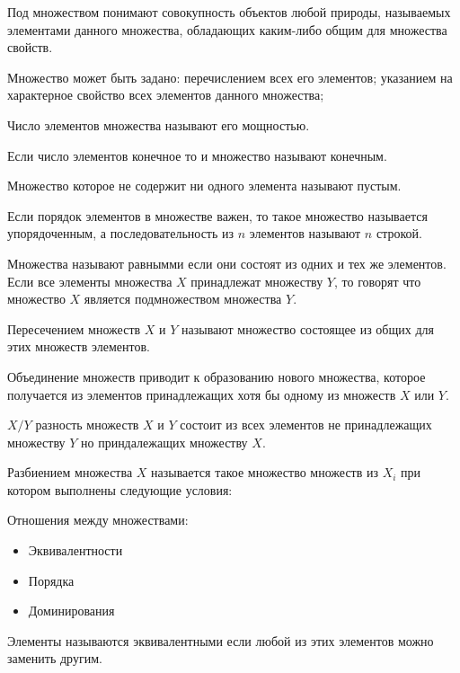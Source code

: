 \documentclass{article}
\begin{document}
Под множеством понимают совокупность объектов любой природы, называемых элементами данного множества, обладающих каким-либо общим для множества свойств.

Множество может быть задано: перечислением всех его элементов; указанием на характерное свойство всех элементов данного множества;

Число элементов множества называют его мощностью.

Если число элементов конечное то и множество называют конечным.

Множество которое не содержит ни одного элемента называют пустым. %

Если порядок элементов в множестве важен, то такое множество называется упорядоченным, а последовательность из $n$ элементов называют $n$ строкой.

Множества называют равнымми если они состоят из одних и тех же элементов. Если все элементы множества $X$ принадлежат множеству $Y$, то говорят что множество $X$ является подмножеством множества $Y$. %

Пересечением множеств $X$ и $Y$ называют множество состоящее из общих для этих множеств элементов.


Объединение множеств приводит к образованию нового множества, которое получается из элементов принадлежащих хотя бы одному из множеств $X$ или $Y$.

$X / Y$ разность множеств $X$ и $Y$ состоит из всех элементов не принадлежащих множеству $Y$ но приндалежащих множеству $X$.

Разбиением множества $X$ называется такое множество множеств из $X_i$ при котором выполнены следующие условия: %

Отношения между множествами:
\begin{itemize}
	\item Эквивалентности
	\item Порядка
	\item Доминирования
\end{itemize}
Элементы называются эквивалентными если любой из этих элементов можно заменить другим.
\end{document}
